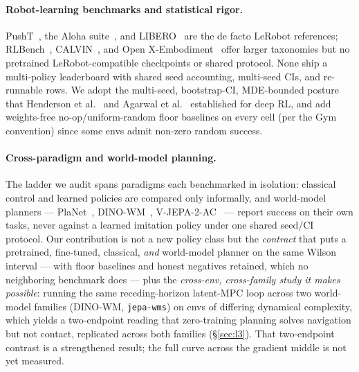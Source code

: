 \documentclass[10pt]{article}
\begin{document}
\paragraph{Robot-learning benchmarks and statistical rigor.}
PushT~\cite{chi2023diffusion}, the Aloha suite~\cite{zhao2023learning},
and LIBERO~\cite{liu2023libero} are the de facto LeRobot references;
RLBench~\cite{james2020rlbench}, CALVIN~\cite{mees2022calvin}, and Open
X-Embodiment~\cite{bohg2025open} offer larger taxonomies but no
pretrained LeRobot-compatible checkpoints or shared protocol. None ship a
multi-policy leaderboard with shared seed accounting, multi-seed CIs, and
re-runnable rows. We adopt the multi-seed, bootstrap-CI, MDE-bounded
posture that Henderson et al.~\cite{henderson2018deep} and Agarwal et
al.~\cite{agarwal2021deep} established for deep RL, and add weights-free
no-op/uniform-random floor baselines on every cell (per the
Gym~\cite{brockman2016openai} convention) since some envs admit non-zero
random success.

\paragraph{Cross-paradigm and world-model planning.}
The ladder we audit spans paradigms each benchmarked in isolation:
classical control and learned policies are compared only informally, and
world-model planners --- PlaNet~\cite{hafner2019planet},
DINO-WM~\cite{zhou2024dinowm}, V-JEPA-2-AC~\cite{assran2025vjepa2} ---
report success on their own tasks, never against a learned imitation
policy under one shared seed/CI protocol. Our contribution is not a new
policy class but the \emph{contract} that puts a pretrained, fine-tuned,
classical, \emph{and} world-model planner on the same Wilson interval ---
with floor baselines and honest negatives retained, which no neighboring
benchmark does --- plus the \emph{cross-env, cross-family study it makes
possible}: running the same receding-horizon latent-MPC loop across two
world-model families (DINO-WM, \texttt{jepa-wms}) on envs of differing
dynamical complexity, which yields a two-endpoint reading that
zero-training planning solves navigation but not contact, replicated across
both families (\S\ref{sec:l3}). That two-endpoint contrast is a
strengthened result; the full curve across the gradient middle is not yet
measured.

\end{document}
